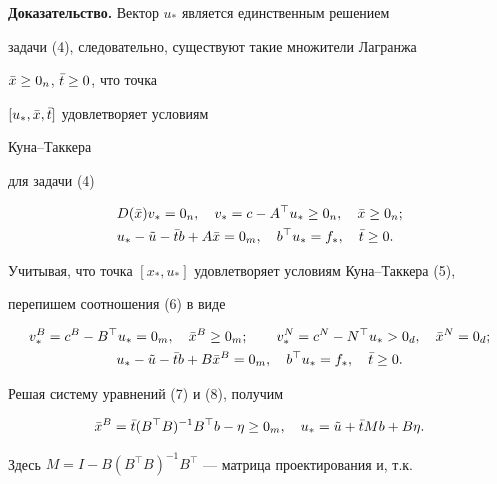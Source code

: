 {\bf Доказательство.} Вектор $u_*$ является единственным решением


задачи (4), следовательно, существуют такие множители Лагранжа


$\Bar x\ge 0_n$, $\Bar t\ge 0$, что точка


$[u_*,\Bar x,\Bar t]$ удовлетворяет условиям


Куна--Таккера


для задачи (4)


\begin{equation}


\begin{split}


& D(\Bar x)v_*=0_n,\quad v_*=c-A^\top u_*\ge 0_n,\quad


\Bar x\ge 0_n;\\


& u_*-\Tilde u-\Bar t b+A\Bar x=0_m,\quad


b^\top u_*=f_*,\quad \Bar t\ge 0.


\end{split}


\end{equation}


Учитывая, что точка $[x_*,u_*]$ удовлетворяет условиям Куна--Таккера (5),


перепишем соотношения (6) в виде


\begin{gather}


v^B_*=c^B-B^\top u_*=0_m,\quad \Bar x^B\ge 0_m;\qquad


v^N_*=c^N-N^\top u_*>0_d,\quad \Bar x^N=0_d;\\


u_*-\Tilde u-\Bar t b+B\Bar x^B=0_m,\quad


b^\top u_*=f_*,\quad \Bar t\ge 0.


\end{gather}





Решая систему уравнений (7) и (8), получим


\begin{equation}


\Bar x^B=\Bar t(B^\top B)^{-1}B^\top b-\eta\ge 0_m,\quad


u_*=\Tilde u+\Bar t Mb+B\eta.


\end{equation}


Здесь $M=I-B(B^\top B)^{-1}B^\top$ --- матрица проектирования и, т.к.


